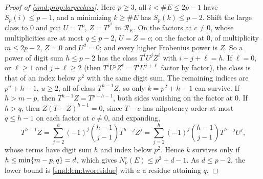 \begin{proof}[Proof of \cref{smd:prop:largeclass}]
Here $p\ge3$, all $i<\#E\le2p-1$ have $S_p(i)\le p-1$, and a minimizing $k\ge\#E$ has
$S_p(k)\le p-2$. Shift the large class to $0$ and put $U=T^p$, $Z=T^{p^2}$ in $\mathcal R_E$.
On the factors at $c\ne0$, whose multiplicities are at most $q\le p-2$, $U=Z=c$; on the factor
at $0$, of multiplicity $m\le2p-2$, $Z=0$ and $U^2=0$; and every higher Frobenius power is $Z$.
So a power of digit sum $h\le p-2$ has the class $T^iU^jZ^\ell$ with $i+j+\ell=h$. If $\ell=0$,
or $\ell\ge1$ and $j+\ell\ge2$ (then $T^iU^jZ^\ell=T^iU^{j+\ell}$ factor by factor), the class
is that of an index below $p^2$ with the same digit sum. The remaining indices are
$p^u+h-1$, $u\ge2$, all of class $T^{h-1}Z$, so only $k=p^2+h-1$ can survive. If $h>m-p$, then $T^{h-1}Z=T^{p+h-1}$, both sides
vanishing on the factor at $0$. If $h>q$, then $Z(T-Z)^{h-1}=0$, since $T-c$ has nilpotency order
at most $q\le h-1$ on each factor at $c\ne0$, and expanding,
\[
 T^{h-1}Z=\sum_{j=2}^{h}(-1)^j\binom{h-1}{j-1}T^{h-j}Z^j=\sum_{j=2}^{h}(-1)^j\binom{h-1}{j-1}T^{h-j}U^j,
\]
whose terms have digit sum $h$ and index below $p^2$. Hence $k$ survives only if
$h\le\min\{m-p,q\}=d$, which gives $N^\circ_p(E)\le p^2+d-1$. As $d\le p-2$, the lower bound
is \cref{smd:lem:tworesidue} with $a$ a residue attaining $q$.
\end{proof}

